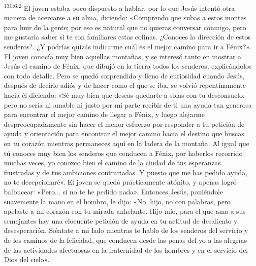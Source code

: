 \par
\textsuperscript{130:6.2} El joven estaba poco dispuesto a hablar, por lo que Jesús intentó otra manera de acercarse a su alma, diciendo: «Comprendo que subas a estos montes para huir de la gente; por eso es natural que no quieras conversar conmigo, pero me gustaría saber si te son familiares estas colinas. ¿Conoces la dirección de estos senderos?. ¿Y podrías quizás indicarme cuál es el mejor camino para ir a Fénix?». El joven conocía muy bien aquellas montañas, y se interesó tanto en mostrar a Jesús el camino de Fénix, que dibujó en la tierra todos los senderos, explicándolos con todo detalle. Pero se quedó sorprendido y lleno de curiosidad cuando Jesús, después de decirle adiós y de hacer como el que se iba, se volvió repentinamente hacia él diciendo: «Sé muy bien que deseas quedarte a solas con tu desconsuelo; pero no sería ni amable ni justo por mi parte recibir de ti una ayuda tan generosa para encontrar el mejor camino de llegar a Fénix, y luego alejarme despreocupadamente sin hacer el menor esfuerzo por responder a tu petición de ayuda y orientación para encontrar el mejor camino hacia el destino que buscas en tu corazón mientras permaneces aquí en la ladera de la montaña. Al igual que tú conoces muy bien los senderos que conducen a Fénix, por haberlos recorrido muchas veces, yo conozco bien el camino de la ciudad de tus esperanzas frustradas y de tus ambiciones contrariadas. Y puesto que me has pedido ayuda, no te decepcionaré». El joven se quedó prácticamente atónito, y apenas logró balbucear: «Pero... si no te he pedido nada». Entonces Jesús, poniéndole suavemente la mano en el hombro, le dijo: «No, hijo, no con palabras, pero apelaste a mi corazón con tu mirada anhelante. Hijo mío, para el que ama a sus semejantes hay una elocuente petición de ayuda en tu actitud de desaliento y desesperación. Siéntate a mi lado mientras te hablo de los senderos del servicio y de los caminos de la felicidad, que conducen desde las penas del yo a las alegrías de las actividades afectuosas en la fraternidad de los hombres y en el servicio del Dios del cielo».

